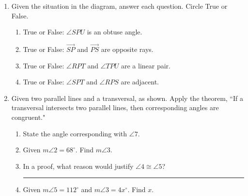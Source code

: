 \documentclass[12pt, oneside]{article}
\begin{document}
\begin{enumerate}
\newpage
  \item Given the situation in the diagram, answer each question. Circle True or False. %
      \begin{center}
    \end{center}
    \begin{enumerate}
      \item True or False: $\angle SPU$ is an obtuse angle.
      \item True or False: $\overrightarrow{SP}$ and $\overrightarrow{PS}$ are opposite rays.
      \item True or False: $\angle RPT$ and $\angle TPU$ are a linear pair.
      \item True or False: $\angle SPT$ and $\angle RPS$ are adjacent.
    \end{enumerate}

  \item Given two parallel lines and a transversal, as shown. Apply the theorem, ``If a transversal intersects two parallel lines, then corresponding angles are congruent."
    \begin{center}
    \end{center}
    \begin{enumerate}
      \item State the angle corresponding with $\angle 7$. \bigskip
      \item Given $m\angle 2 = 68^\circ$. Find $m\angle 3$. \bigskip
      \item In a proof, what reason would justify $\angle 4 \cong \angle 5$? \rule{6cm}{0.15mm} \bigskip
      \item Given $m\angle 5 = 112^\circ$ and $m\angle 3 = 4x^\circ$. Find $x$.
    \end{enumerate}


\end{enumerate}
\end{document}
